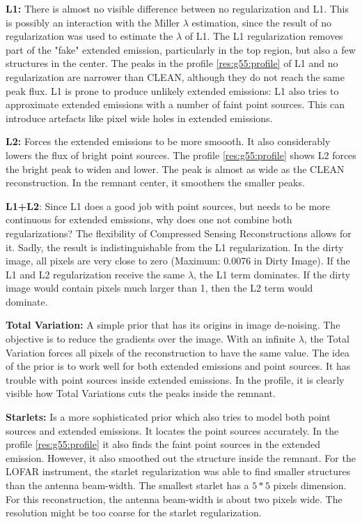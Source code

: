 \textbf{L1:} There is almost no visible difference between no regularization and L1. This is possibly an interaction with the Miller $\lambda$ estimation, since the result of no regularization was used to estimate the $\lambda$ of L1. The L1 regularization removes part of the "fake" extended emission, particularly in the top region, but also a few structures in the center. The peaks in the profile \ref{res:g55:profile} of L1 and no regularization are narrower than CLEAN, although they do not reach the same peak flux. L1 is prone to produce unlikely extended emissions: L1 also tries to approximate extended emissions with a number of faint point sources. This can introduce artefacts like pixel wide holes in extended emissions.

\textbf{L2:} Forces the extended emissions to be more smoooth. It also considerably lowers the flux of bright point sources. The profile \ref{res:g55:profile} shows L2 forces the bright peak to widen and lower. The peak is almost as wide as the CLEAN reconstruction. In the remnant center, it smoothers the smaller peaks.

\textbf{L1+L2}: Since L1 does a good job with point sources, but needs to be more continuous for extended emissions, why does one not combine both regularizations? The flexibility of Compressed Sensing Reconstructions allows for it. Sadly, the result is indistinguishable from the L1 regularization. In the dirty image, all pixels are very close to zero (Maximum: 0.0076 in Dirty Image). If the L1 and L2 regularization receive the same $\lambda$, the L1 term dominates. If the dirty image would contain pixels much larger than 1, then the L2 term would dominate.

\textbf{Total Variation:} A simple prior that has its origins in image de-noising. The objective is to reduce the gradients over the image. With an infinite $\lambda$, the Total Variation forces all pixels of the reconstruction to have the same value. The idea of the prior is to work well for both extended emissions and point sources. It has trouble with point sources inside extended emissions. In the profile, it is clearly visible how Total Variations cuts the peaks inside the remnant.

\textbf{Starlets:} Is a more sophisticated prior which also tries to model both point sources and extended emissions. It locates the point sources accurately. In the profile \ref{res:g55:profile} it also finds the faint point sources in the extended emission. However, it also smoothed out the structure inside the remnant. For the LOFAR instrument, the starlet regularization was able to find smaller structures than the antenna beam-width\cite{girard2015sparse}. The smallest starlet has a $5*5$ pixels dimension. For this reconstruction, the antenna beam-width is about two pixels wide. The resolution might be too coarse for the starlet regularization.

